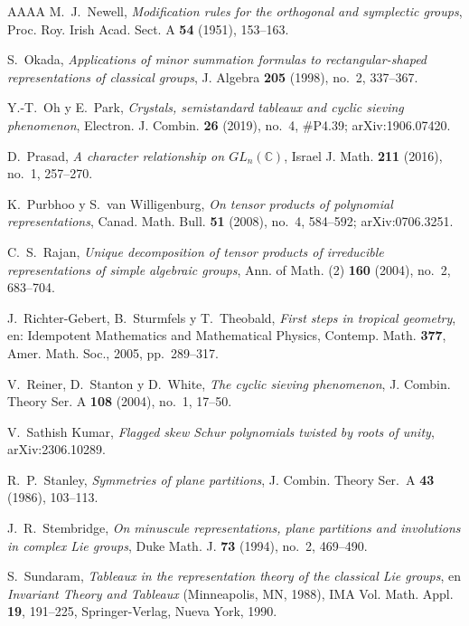 \documentclass[11pt,reqno]{amsart}
\theoremstyle{plain}
\theoremstyle{definition}
\newcommand{\CC}{\mathbb{C}}
\begin{document}
\begin{thebibliography}{AAAA}
 M.~J.~Newell, \emph{Modification rules for the orthogonal and symplectic
groups}, Proc. Roy. Irish Acad. Sect. A \textbf{54} (1951), 153--163.

 S.~Okada, \emph{Applications of minor summation formulas to
rectangular-shaped representations of classical groups}, J. Algebra \textbf{205} (1998), no.~2,
337--367.

 Y.-T.~Oh y E.~Park, \emph{Crystals, semistandard tableaux and cyclic sieving
phenomenon}, Electron. J. Combin. \textbf{26} (2019), no.~4, \#P4.39; arXiv:1906.07420.

 D.~Prasad, \emph{A character relationship on $GL_n(\CC)$}, Israel J. Math.
\textbf{211} (2016), no.~1, 257--270.

 K.~Purbhoo y S.~van Willigenburg, \emph{On tensor products of polynomial
representations}, Canad. Math. Bull. \textbf{51} (2008), no.~4, 584--592; arXiv:0706.3251.

 C.~S.~Rajan, \emph{Unique decomposition of tensor products of irreducible
representations of simple algebraic groups}, Ann. of Math. (2) \textbf{160} (2004), no.~2, 683--704.

 J.~Richter-Gebert, B.~Sturmfels y T.~Theobald, \emph{First steps in
tropical geometry}, en: Idempotent Mathematics and Mathematical Physics, Contemp. Math. \textbf{377},
Amer. Math. Soc., 2005, pp.~289--317.

 V.~Reiner, D.~Stanton y D.~White, \emph{The cyclic sieving phenomenon},
J. Combin. Theory Ser. A \textbf{108} (2004), no.~1, 17--50.

 V.~Sathish Kumar, \emph{Flagged skew Schur polynomials twisted by roots of
unity}, arXiv:2306.10289.

 R.~P.~Stanley, \emph{Symmetries of plane partitions}, J. Combin. Theory
Ser.~A \textbf{43} (1986), 103--113.

 J.~R.~Stembridge, \emph{On minuscule representations, plane partitions and
involutions in complex Lie groups}, Duke Math. J. \textbf{73} (1994), no.~2, 469--490.

 S.~Sundaram, \emph{Tableaux in the representation theory of the classical Lie
groups}, en \emph{Invariant Theory and Tableaux} (Minneapolis, MN, 1988), IMA Vol. Math. Appl.
\textbf{19}, 191--225, Springer-Verlag, Nueva York, 1990.

\end{thebibliography}
\end{document}
